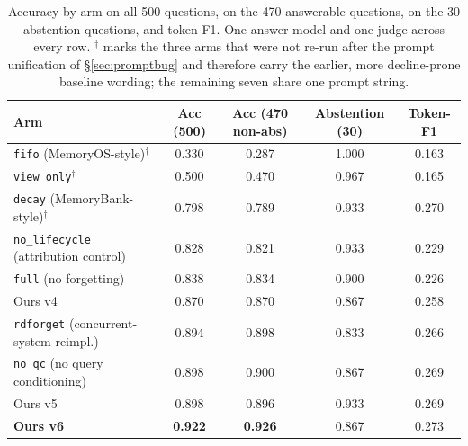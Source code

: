 \documentclass[11pt]{article}
\newcommand{\arm}[1]{\texttt{#1}}
\begin{document}
\begin{table}[ht]
\centering
\small
\setlength{\tabcolsep}{4.5pt}
\begin{tabular}{@{}lcccc@{}}
\toprule
\textbf{Arm} & \textbf{Acc (500)} & \textbf{Acc (470 non-abs)} & \textbf{Abstention (30)} & \textbf{Token-F1} \\
\midrule
\arm{fifo} (MemoryOS-style)$^{\dagger}$   & 0.330 & 0.287 & 1.000 & 0.163 \\
\arm{view\_only}$^{\dagger}$              & 0.500 & 0.470 & 0.967 & 0.165 \\
\arm{decay} (MemoryBank-style)$^{\dagger}$& 0.798 & 0.789 & 0.933 & 0.270 \\
\arm{no\_lifecycle} (attribution control) & 0.828 & 0.821 & 0.933 & 0.229 \\
\arm{full} (no forgetting)                & 0.838 & 0.834 & 0.900 & 0.226 \\
Ours v4                                   & 0.870 & 0.870 & 0.867 & 0.258 \\
\arm{rdforget} (concurrent-system reimpl.)& 0.894 & 0.898 & 0.833 & 0.266 \\
\arm{no\_qc} (no query conditioning)      & 0.898 & 0.900 & 0.867 & 0.269 \\
Ours v5                                   & 0.898 & 0.896 & 0.933 & 0.269 \\
\textbf{Ours v6}                          & \textbf{0.922} & \textbf{0.926} & 0.867 & 0.273 \\
\bottomrule
\end{tabular}
\caption{Accuracy by arm on all 500 questions, on the 470 answerable questions, on the 30 abstention questions, and token-F1. One answer model and one judge across every row. $^{\dagger}$ marks the three arms that were not re-run after the prompt unification of \S\ref{sec:promptbug} and therefore carry the earlier, more decline-prone baseline wording; the remaining seven share one prompt string.}
\end{table}
\end{document}
